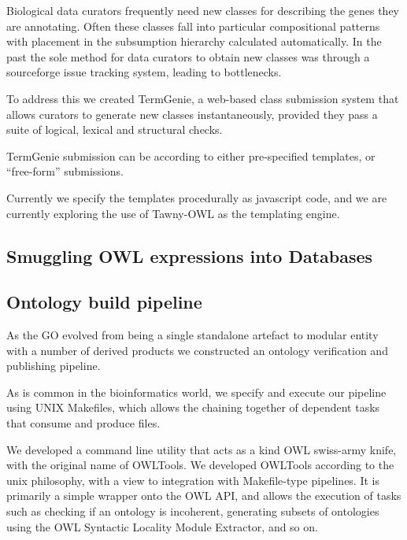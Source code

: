 \documentclass{llncs}
\begin{document}
Biological data curators frequently need new classes for describing
the genes they are annotating. Often these classes fall into
particular compositional patterns with placement in the subsumption
hierarchy calculated automatically. In the past the sole method for
data curators to obtain new classes was through a sourceforge issue
tracking system, leading to bottlenecks.

To address this we created TermGenie\cite{Dietze2014}, a web-based
class submission system that allows curators to generate new classes
instantaneously, provided they pass a suite of logical, lexical and
structural checks.

TermGenie submission can be according to either pre-specified
templates, or ``free-form'' submissions.

Currently we specify the templates procedurally as javascript code,
and we are currently exploring the use of Tawny-OWL\cite{Tawny} as the
templating engine.

\subsection{Smuggling OWL expressions into Databases}

\cite{Huntley2014}


\subsection{Ontology build pipeline}

As the GO evolved from being a single standalone artefact to modular
entity with a number of derived products we constructed an ontology
verification and publishing pipeline.

As is common in the bioinformatics world, we specify and execute our
pipeline using UNIX Makefiles, which allows the chaining together of
dependent tasks that consume and produce files.

We developed a command line utility that acts as a kind OWL swiss-army
knife, with the original name of OWLTools\cite{OWLTools}. We developed
OWLTools according to the unix philosophy, with a view to integration
with Makefile-type pipelines. It is primarily a simple wrapper onto
the OWL API, and allows the execution of tasks such as checking if an
ontology is incoherent, generating subsets of ontologies using the OWL
Syntactic Locality Module Extractor, and so on.
\end{document}
